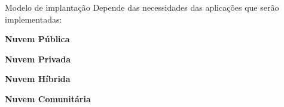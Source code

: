 \begin{frame}{Modelo de implantação}
    Depende das necessidades das aplicações que serão implementadas:
    \begin{itemise}
        \item<2-> \textbf{Nuvem Pública}
        \item<3-> \textbf{Nuvem Privada}
        \item<4-> \textbf{Nuvem Híbrida}
        \item<5-> \textbf{Nuvem Comunitária}
    \end{itemise}
\end{frame}
